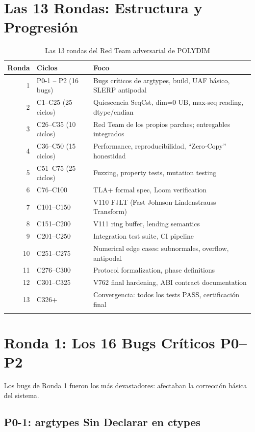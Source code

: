 \section{Las 13 Rondas: Estructura y Progresión}

\begin{longtable}{rp{3cm}p{8cm}}
\toprule
\textbf{Ronda} & \textbf{Ciclos} & \textbf{Foco} \\
\midrule
1 & P0-1 -- P2 (16 bugs) & Bugs críticos de argtypes, build, UAF básico, SLERP antipodal \\
2 & C1--C25 (25 ciclos) & Quiescencia SeqCst, dim=0 UB, max-seq reading, dtype/endian \\
3 & C26--C35 (10 ciclos) & Red Team de los propios parches; entregables integrados \\
4 & C36--C50 (15 ciclos) & Performance, reproducibilidad, ``Zero-Copy'' honestidad \\
5 & C51--C75 (25 ciclos) & Fuzzing, property tests, mutation testing \\
6 & C76--C100 & TLA+ formal spec, Loom verification \\
7 & C101--C150 & V110 FJLT (Fast Johnson-Lindenstrauss Transform) \\
8 & C151--C200 & V111 ring buffer, lending semantics \\
9 & C201--C250 & Integration test suite, CI pipeline \\
10 & C251--C275 & Numerical edge cases: subnormales, overflow, antipodal \\
11 & C276--C300 & Protocol formalization, phase definitions \\
12 & C301--C325 & V762 final hardening, ABI contract documentation \\
13 & C326+ & Convergencia: todos los tests PASS, certificación final \\
\bottomrule
\caption{Las 13 rondas del Red Team adversarial de POLYDIM}
\label{tab:rondas}
\end{longtable}

\section{Ronda 1: Los 16 Bugs Críticos P0--P2}

Los bugs de Ronda 1 fueron los más devastadores: afectaban la corrección básica del sistema.

\subsection{P0-1: argtypes Sin Declarar en ctypes}

